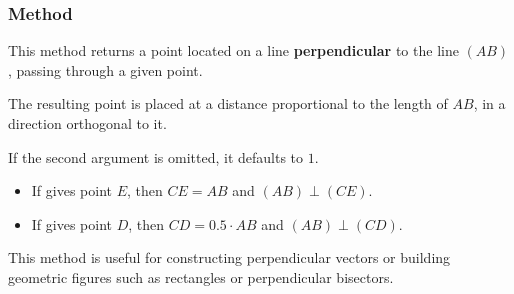 \subsubsection{Method } %
\label{ssub:method_line_orthogonal__at}

This method returns a point located on a line \textbf{perpendicular} to the line $(AB)$, passing through a given point.

The resulting point is placed at a distance proportional to the length of $AB$, in a direction orthogonal to it.

\medskip
\noindent
If the second argument  is omitted, it defaults to $1$.

\medskip
\noindent
{}
\begin{itemize}
  \item If  gives point $E$, then $CE = AB$ and $(AB) \perp (CE)$.
  \item If  gives point $D$, then $CD = 0.5 \cdot AB$ and $(AB) \perp (CD)$.
\end{itemize}

\noindent
This method is useful for constructing perpendicular vectors or building geometric figures such as rectangles or perpendicular bisectors.

\vspace{1em}
\begin{minipage}{.5\textwidth}
\begin{center}
\end{center}
\end{minipage}
\begin{minipage}{.5\textwidth}
\begin{tkzexample}
\end{tkzexample}
\end{minipage}

